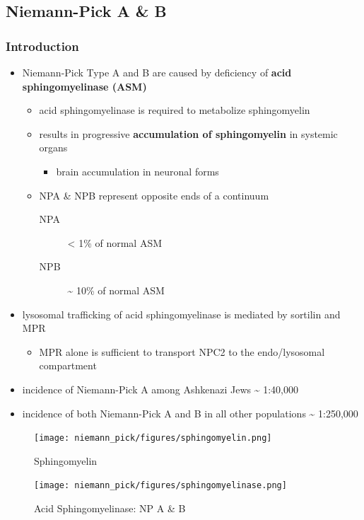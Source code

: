 \documentclass[12pt]{scrartcl}
\begin{document}
\subsection{Niemann-Pick  A \& B}
\label{sec:org43fad8d}
\subsubsection{Introduction}
\label{sec:org5056201}
\begin{itemize}
\item Niemann-Pick Type A and B are caused by deficiency of \textbf{acid sphingomyelinase (ASM)}
\begin{itemize}
\item acid sphingomyelinase is required to metabolize sphingomyelin
\item results in progressive \textbf{accumulation of sphingomyelin} in systemic organs
\begin{itemize}
\item brain accumulation in neuronal forms
\end{itemize}
\item NPA \& NPB represent opposite ends of a continuum
\begin{description}
\item[{NPA}] \textless{} 1\% of normal ASM
\item[{NPB}] \textasciitilde{} 10\% of normal ASM
\end{description}
\end{itemize}
\item lysosomal trafficking of acid sphingomyelinase is mediated by
sortilin and MPR
\begin{itemize}
\item MPR alone is sufficient to transport NPC2 to the endo/lysosomal compartment
\end{itemize}
\item incidence of Niemann-Pick A among Ashkenazi Jews \textasciitilde{} 1:40,000
\item incidence of both Niemann-Pick A and B in all other populations \textasciitilde{} 1:250,000
\end{itemize}

\begin{figure}[htbp]
\centering
\texttt{[image: niemann\_pick/figures/sphingomyelin.png]}
\caption{\label{fig:orgcb828dc}Sphingomyelin}
\end{figure}

\begin{figure}[htbp]
\centering
\texttt{[image: niemann\_pick/figures/sphingomyelinase.png]}
\caption{\label{fig:org5048da2}Acid Sphingomyelinase: NP A \& B}
\end{figure}
\end{document}
